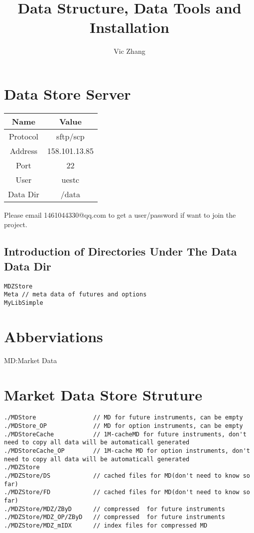 \documentclass{article}
\begin{document}
\title{Data Structure, Data Tools and Installation}
\author{Vic Zhang}
\maketitle
\section{Data Store Server}
\begin{table}[h]
\begin{tabular}{c c}
\hline\hline
Name & Value\\[0.5ex]
\hline
Protocol& sftp/scp \\
Address&158.101.13.85 \\
Port&22 \\
User&uestc\\
Data Dir & /data\\
\hline
\end{tabular}
\label{table:nonlin}
\end{table}
Please email 1461044330@qq.com to get a user/password if want to join the project.
\subsection{Introduction of Directories Under The Data Data Dir}
\begin{verbatim}
MDZStore
Meta // meta data of futures and options
MyLibSimple
\end{verbatim}
\section{Abberviations}
MD:Market Data


\section{Market Data Store Struture}
\begin{verbatim}
./MDStore                // MD for future instruments, can be empty
./MDStore_OP             // MD for option instruments, can be empty
./MDStoreCache           // 1M-cacheMD for future instruments, don't need to copy all data will be automaticall generated 
./MDStoreCache_OP        // 1M-cache MD for option instruments, don't need to copy all data will be automaticall generated 
./MDZStore
./MDZStore/DS            // cached files for MD(don't need to know so far)
./MDZStore/FD            // cached files for MD(don't need to know so far)
./MDZStore/MDZ/ZByD      // compressed  for future instruments
./MDZStore/MDZ_OP/ZByD   // compressed  for future instruments
./MDZStore/MDZ_mIDX      // index files for compressed MD
\end{verbatim}
\end{document}
